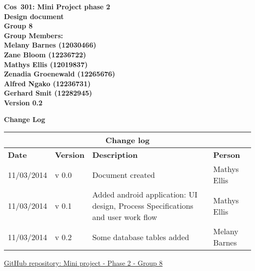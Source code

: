 \documentclass[12pt]{article}
\newcommand{\Title}{Design document} %
\newcommand{\Class}{Cos\ 301} %
\begin{document}
	\vspace{4em}
	
	\begin{center}%
	\LARGE \bf \Class: Mini Project phase 2 \\
	  \LARGE \bf \Title \\[4em]
	  \LARGE {\bf Group 8}\\[1em]
	  \LARGE {\bf Group Members:}\\[2em]
	  \large
	     Melany Barnes					(12030466) \\[1em]
	     Zane Bloom						(12236722) \\[1em]
	     Mathys Ellis					(12019837) \\[1em]
	     Zenadia Groenewald				(12265676) \\[1em]
	     Alfred Ngako					(12236731) \\[1em]
	  	 Gerhard Smit					(12282945) \\[1em]
	     {\bf Version 0.2}
	    
	\end{center}
	
	\newpage
		{\LARGE \bf Change Log}\\[2em]
		
		\begin{center}
		\begin{tabular}{|l|p{1.4cm}|p{8cm}|p{2.8cm}|}
		\hline
		\multicolumn{4}{|c|}{\bf Change log} \\
		\hline
		\bf Date & \bf Version & \bf Description & \bf Person \\
		\hline
		11/03/2014 & v 0.0 & Document created & Mathys Ellis \\
		\hline
		11/03/2014 & v 0.1 & Added android application: UI design, Process Specifications and user work flow & Mathys Ellis \\
		\hline
		11/03/2014 & v 0.2 & Some database tables added & Melany Barnes \\
		\hline
		\end{tabular}
		\end{center}
		
	\newpage
	\tableofcontents
	
	\vspace{0.5in}
	
	\begin{flushleft}
		\LARGE\href{https://github.com/mox1990/COS_301_GROUP8_Phase_2}{GitHub repository: Mini project - Phase 2 -  Group 8}
	\end{flushleft}
	
\end{document}
